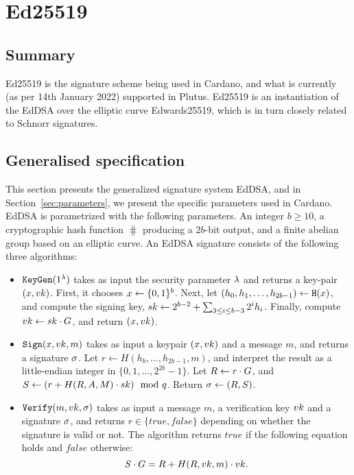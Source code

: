 \section{Ed25519}
\label{sec:ed25519}

\subsection{Summary}
Ed25519 is the signature scheme being used in Cardano, and what is currently (as per 14th January 2022) supported in Plutus. Ed25519 is an instantiation of the EdDSA over the elliptic curve Edwards25519, which is in turn closely related to Schnorr signatures.
\subsection{Generalised specification}
This section presents the generalized signature system EdDSA, and in Section~\ref{sec:parameters}, we present the specific parameters used in Cardano. EdDSA is parametrized with the following parameters. An integer $b\geq 10$, a cryptographic hash function $\hash$ producing a $2b$-bit output, and a finite abelian group based on an elliptic curve. An EdDSA signature consists of the following three algorithms:
\begin{itemize}
\item $\texttt{KeyGen}(1^\lambda)$ takes as input the security parameter $\lambda$ and returns a key-pair $(x, vk)$. First, it chooses $x\leftarrow\{0,1\}^b$. Next, let $(h_0, h_1, \ldots, h_{2b - 1})\gets\texttt{H}(x)$, and compute the signing key, $sk \gets 2^{b-2} + \sum_{3\leq i\leq b-3}2^i h_i$. Finally, compute $vk \gets sk \cdot G$, and return $(x, vk)$.
\item $\texttt{Sign}(x, vk, m)$ takes as input a keypair $(x, vk)$ and a message $m$, and returns a signature $\sigma$. Let $r \gets H(h_b, \ldots, h_{2b-1}, m)$, and interpret the result as a little-endian integer in $\{0,1,\ldots, 2^{2b}-1\}$. Let $R \gets r\cdot G$, and $S \gets (r + H(R, A, M)\cdot sk) \mod {q}$. Return $\sigma \gets (R, S)$.
\item $\texttt{Verify}(m, vk, \sigma)$ takes as input a message $m$, a verification key $vk$ and a signature $\sigma$, and returns $r\in\{true, false\}$ depending on whether the signature is valid or not. The algorithm returns $true$ if the following equation holds and $false$ otherwise:
\[S\cdot G = R + H(R, vk, m)\cdot vk.\]
\end{itemize}

